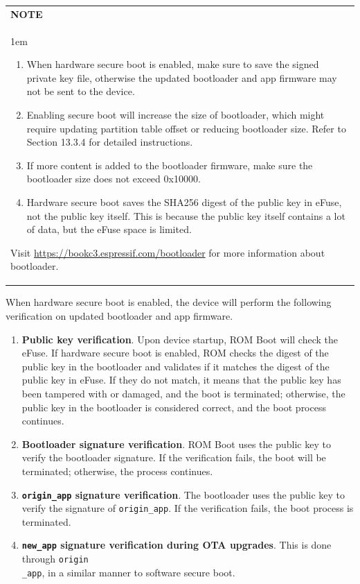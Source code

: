 \documentclass[a4paper,12pt,openany]{book}
\newcommand{\note}[2][NOTE]{ %
\vspace{6pt}
\begin{tabular}{b{\textwidth}}
\hline
\fontfamily{phv}\selectfont \textbf{#1}\\
\leftskip 1em #2\\
\hline
\end{tabular}
}
\begin{document}
\note{
\vspace{2pt}
\begin{enumerate}[label=\arabic*.]
    \item When hardware secure boot is enabled, make sure to save the signed private key file, otherwise the updated bootloader and app firmware may not be sent to the device.
    \item Enabling secure boot will increase the size of bootloader, which might require updating partition table offset or reducing bootloader size. Refer to Section 13.3.4 for detailed instructions.
    \item If more content is added to the bootloader firmware, make sure the bootloader size does not exceed 0x10000.
    \item Hardware secure boot saves the SHA256 digest of the public key in eFuse, not the public key itself. This is because the public key itself contains a lot of data, but the eFuse space is limited.
\end{enumerate}
Visit \url{https://bookc3.espressif.com/bootloader} for more information about bootloader.
}

When hardware secure boot is enabled, the device will perform the following verification on updated bootloader and app firmware.

\begin{enumerate}[label=(\arabic*)]
    \item \textbf{Public key verification}. Upon device startup, ROM Boot will check the eFuse. If hardware secure boot is enabled, ROM checks the digest of the public key in the bootloader and validates if it matches the digest of the public key in eFuse. If they do not match, it means that the public key has been tampered with or damaged, and the boot is terminated; otherwise, the public key in the bootloader is considered correct, and the boot process continues.
    \item \textbf{Bootloader signature verification}. ROM Boot uses the public key to verify the bootloader signature. If the verification fails, the boot will be terminated; otherwise, the process continues.
    \item \textbf{\texttt{origin\_app} signature verification}. The bootloader uses the public key to verify the signature of \verb|origin_app|. If the verification fails, the boot process is terminated.
    \item \textbf{\texttt{new\_app} signature verification during OTA upgrades}. This is done through \verb|origin|\\ \verb|_app|, in a similar manner to software secure boot.
\end{enumerate}
\end{document}
